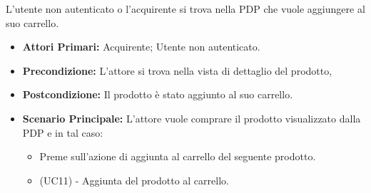L'utente non autenticato o l'acquirente si trova nella PDP che vuole aggiungere al suo carrello.
\begin{itemize}
    \item \textbf{Attori Primari:} Acquirente; Utente non autenticato.
    \item \textbf{Precondizione:} L'attore si trova nella vista di dettaglio del prodotto,
    \item \textbf{Postcondizione:} Il prodotto è stato aggiunto al suo carrello.
    \item \textbf{Scenario Principale:} L'attore vuole comprare il prodotto visualizzato dalla PDP e in tal caso:
    \begin{itemize}
        \item Preme sull'azione di aggiunta al carrello del seguente prodotto.
        \item (UC11) - Aggiunta del prodotto al carrello.
    \end{itemize}
\end{itemize}
